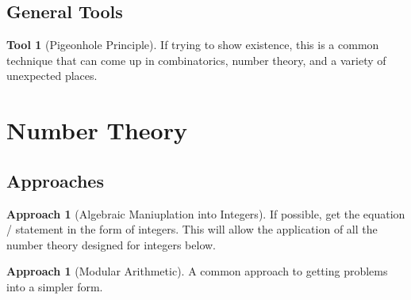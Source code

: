 \documentclass[12pt]{amsart}
\theoremstyle{definition}
\newtheorem{tool}[theorem]{Tool}
\newtheorem{approach}[theorem]{Approach}
\begin{document}
\subsection{General Tools}
\begin{tool}[Pigeonhole Principle] If trying to show existence, this is a
    common technique that can come up in combinatorics, number theory, and
    a variety of unexpected places.
\end{tool}
\section{Number Theory}
\subsection{Approaches}
\begin{approach}[Algebraic Maniuplation into Integers] If possible, get the
    equation / statement in the form of integers. This will allow the
    application of all the number theory designed for integers below.
\end{approach}
\begin{approach}[Modular Arithmetic] A common approach to getting problems
    into a simpler form. 
\end{approach}
\end{document}
